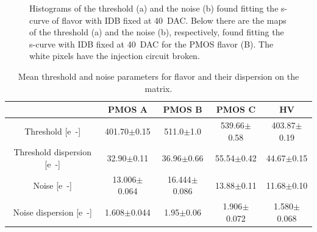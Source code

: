\begin{figure}[h!]
            \label{fig:threshold_noise_hist}
            \caption{Histograms of the threshold (a) and the noise (b) found fitting the s-curve of  flavor with IDB fixed at \SI{40}{DAC}. Below there are the maps of the threshold (a) and the noise (b), respectively, found fitting the s-curve with IDB fixed at \SI{40}{DAC} for the PMOS flavor (B). The white pixels have the injection circuit broken.}
        \end{figure}      

        \begin{table}
            \begin{center}
            \begin{tabular}{| c |  c | c | c |c |}
            \hline
            & PMOS A & PMOS B & PMOS C & HV \\
            \hline
            \hline
            Threshold [\si{e-}] & 401.70$\pm$0.15 & 511.0$\pm$1.0 & 539.66$\pm$0.58 &  403.87$\pm$0.19\\
            Threshold dispersion [\si{e-}] & 32.90$\pm$0.11 & 36.96$\pm$0.66 & 55.54$\pm$0.42 & 44.67$\pm$0.15\\
            Noise [\si{e-}] & 13.006$\pm$0.064 & 16.444$\pm$0.086 & 13.88$\pm$0.11 & 11.68$\pm$0.10\\
            Noise dispersion [\si{e-}] & 1.608$\pm$0.044 & 1.95$\pm$0.06 & 1.906$\pm$0.072 & 1.580$\pm$0.068\\
            \hline
            \end{tabular}
            \caption{Mean threshold and noise parameters for  flavor and their dispersion on the matrix. }
            \label{tab:calibration_param}
            \end{center}
        \end{table}       

